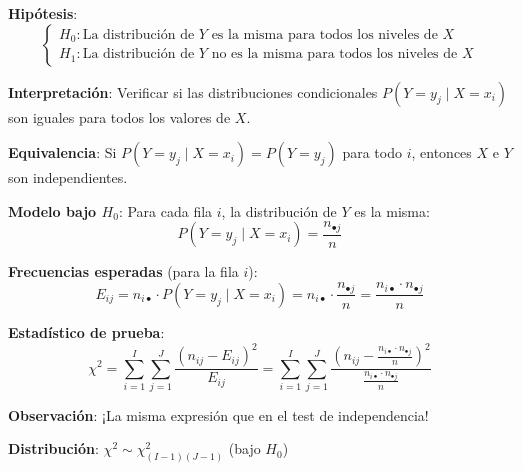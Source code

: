 \documentclass[10pt,a4paper]{article}
\begin{document}

\begin{tcolorbox}[title=Hipótesis del Contraste de Homogeneidad]
    \textbf{Hipótesis}:
    \[
        \begin{cases}
        H_0: \text{La distribución de } Y \text{ es la misma para todos los niveles de } X \\
        H_1: \text{La distribución de } Y \text{ no es la misma para todos los niveles de } X
        \end{cases}
    \]
    
    \textbf{Interpretación}: Verificar si las distribuciones condicionales $P(Y = y_j \mid X = x_i)$ son iguales para todos los valores de $X$.
    
    \textbf{Equivalencia}: Si $P(Y = y_j \mid X = x_i) = P(Y = y_j)$ para todo $i$, entonces $X$ e $Y$ son independientes.
\end{tcolorbox}

\begin{tcolorbox}[title=Test $\chi^2$ de Homogeneidad]
    \textbf{Modelo bajo $H_0$}: Para cada fila $i$, la distribución de $Y$ es la misma:
    \[
        P(Y = y_j \mid X = x_i) = \frac{n_{\bullet j}}{n}
    \]
    
    \textbf{Frecuencias esperadas} (para la fila $i$):
    \[
        E_{ij} = n_{i \bullet} \cdot P(Y = y_j \mid X = x_i) = n_{i \bullet} \cdot \frac{n_{\bullet j}}{n} = \frac{n_{i \bullet} \cdot n_{\bullet j}}{n}
    \]
    
    \textbf{Estadístico de prueba}: 
    \[
        \chi^2 = \sum_{i=1}^I \sum_{j=1}^J \frac{(n_{ij} - E_{ij})^2}{E_{ij}} = \sum_{i=1}^I \sum_{j=1}^J \frac{\left(n_{ij} - \frac{n_{i \bullet} \cdot n_{\bullet j}}{n}\right)^2}{\frac{n_{i \bullet} \cdot n_{\bullet j}}{n}}
    \]
    
    \textbf{Observación}: ¡La misma expresión que en el test de independencia!
    
    \textbf{Distribución}: $\chi^2 \sim \chi^2_{(I-1)(J-1)}$ (bajo $H_0$)
\end{tcolorbox}
\end{document}
